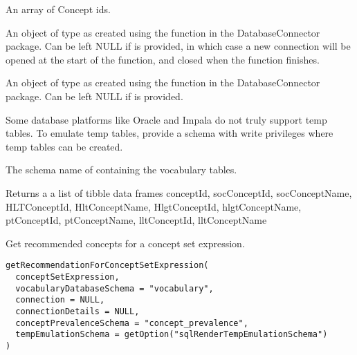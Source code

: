 \documentclass[a4paper]{book}
\begin{document}
\begin{Arguments}
\begin{ldescription}
\item[\code{conceptIds}] An array of Concept ids.

\item[\code{connection}] An object of type  as created using the
 function in the
DatabaseConnector package. Can be left NULL if 
is provided, in which case a new connection will be opened at the start
of the function, and closed when the function finishes.

\item[\code{connectionDetails}] An object of type  as created using the
 function in the
DatabaseConnector package. Can be left NULL if  is
provided.

\item[\code{tempEmulationSchema}] Some database platforms like Oracle and Impala do not truly support temp tables. To emulate temp 
tables, provide a schema with write privileges where temp tables can be created.

\item[\code{vocabularyDatabaseSchema}] The schema name of containing the vocabulary tables.
\end{ldescription}
\end{Arguments}
%
\begin{Value}
Returns a a list of tibble data frames
conceptId,
socConceptId, socConceptName,
HLTConceptId, HltConceptName,
HlgtConceptId, hlgtConceptName,
ptConceptId, ptConceptName,
lltConceptId, lltConceptName
\end{Value}
%
\begin{Description}\relax
Get recommended concepts for a concept set expression.
\end{Description}
%
\begin{Usage}
\begin{verbatim}
getRecommendationForConceptSetExpression(
  conceptSetExpression,
  vocabularyDatabaseSchema = "vocabulary",
  connection = NULL,
  connectionDetails = NULL,
  conceptPrevalenceSchema = "concept_prevalence",
  tempEmulationSchema = getOption("sqlRenderTempEmulationSchema")
)
\end{verbatim}
\end{Usage}
\end{document}
